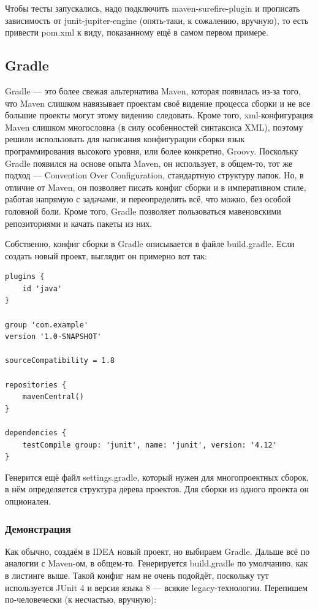 \documentclass[a5paper]{article}
\begin{document}
Чтобы тесты запускались, надо подключить maven-surefire-plugin и прописать зависимость от junit-jupiter-engine (опять-таки, к сожалению, вручную), то есть привести pom.xml к виду, показанному ещё в самом первом примере.

\subsection{Gradle}

Gradle --- это более свежая альтернатива Maven, которая появилась из-за того, что Maven слишком навязывает проектам своё видение процесса сборки и не все большие проекты могут этому видению следовать. Кроме того, xml-конфигурация Maven слишком многословна (в силу особенностей синтаксиса XML), поэтому решили использовать для написания конфигурации сборки язык программирования высокого уровня, или более конкретно, Groovy. Поскольку Gradle появился на основе опыта Maven, он использует, в общем-то, тот же подход --- Convention Over Configuration, стандартную структуру папок. Но, в отличие от Maven, он позволяет писать конфиг сборки и в императивном стиле, работая напрямую с задачами, и переопределять всё, что можно, без особой головной боли. Кроме того, Gradle позволяет пользоваться мавеновскими репозиториями и качать пакеты из них.

Собственно, конфиг сборки в Gradle описывается в файле build.gradle. Если создать новый проект, выглядит он примерно вот так:

\begin{verbatim}
plugins {
    id 'java'
}

group 'com.example'
version '1.0-SNAPSHOT'

sourceCompatibility = 1.8

repositories {
    mavenCentral()
}

dependencies {
    testCompile group: 'junit', name: 'junit', version: '4.12'
}
\end{verbatim}

Генерится ещё файл settings.gradle, который нужен для многопроектных сборок, в нём определяется структура дерева проектов. Для сборки из одного проекта он опционален.

\subsubsection{Демонстрация}

Как обычно, создаём в IDEA новый проект, но выбираем Gradle. Дальше всё по аналогии с Maven-ом, в общем-то. Генерируется build.gradle по умолчанию, как в листинге выше. Такой конфиг нам не очень подойдёт, поскольку тут используется JUnit 4 и версия языка 8 --- всякие legacy-технологии. Перепишем по-человечески (к несчастью, вручную):
\end{document}
